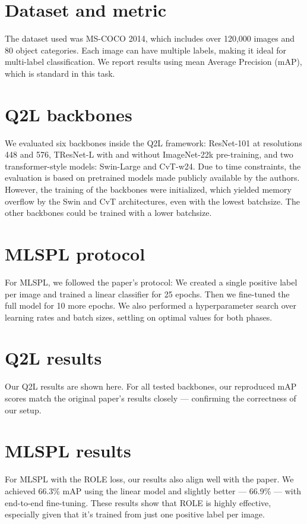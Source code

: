 \documentclass[12pt,a4paper]{article}
\begin{document}
\section*{Dataset and metric}
The dataset used was MS-COCO 2014, which includes over 120,000 images and 80 object categories.
Each image can have multiple labels, making it ideal for multi-label classification.
We report results using mean Average Precision (mAP), which is standard in this task.

\section*{Q2L backbones}
We evaluated six backbones inside the Q2L framework:
ResNet-101 at resolutions 448 and 576,
TResNet-L with and without ImageNet-22k pre-training,
and two transformer-style models: Swin-Large and CvT-w24.
Due to time constraints, the evaluation is based on pretrained models made publicly available by the authors. However, the training of the backbones were initialized, which yielded memory overflow by the Swin and CvT architectures, even with the lowest batchsize. The other backbones could be trained with a lower batchsize.

\section*{MLSPL protocol}
For MLSPL, we followed the paper’s protocol:
We created a single positive label per image and trained a linear classifier for 25 epochs.
Then we fine-tuned the full model for 10 more epochs.
We also performed a hyperparameter search over learning rates and batch sizes, settling on optimal values for both phases.

\section*{Q2L results}
Our Q2L results are shown here.
For all tested backbones, our reproduced mAP scores match the original paper's results closely — confirming the correctness of our setup.

\section*{MLSPL results}
For MLSPL with the ROLE loss, our results also align well with the paper.
We achieved 66.3\% mAP using the linear model and slightly better — 66.9\% — with end-to-end fine-tuning.
These results show that ROLE is highly effective, especially given that it's trained from just one positive label per image.
\end{document}

